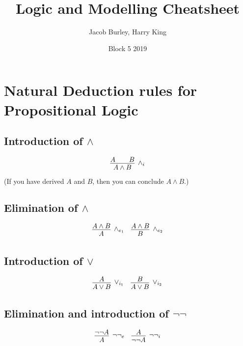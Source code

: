 \documentclass{article}
\title{Logic and Modelling Cheatsheet}
\author{Jacob Burley, Harry King}
\date{Block 5 2019}
\newcommand{\rulename}[1]{#1}
\begin{document}
\maketitle

\section*{Natural Deduction rules for Propositional Logic}
  \subsection*{Introduction of $\wedge$}
      \begin{align*}
        \infer[\rulename{\wedge_i}]
        {A \wedge B}
        {A && B}
      \end{align*}
      (If you have derived $A$ and $B$, then you can conclude $A \wedge B$.)
  \subsection*{Elimination of $\wedge$}
      \begin{align*}
        \infer[\rulename{\wedge_{e_1}}]
        {A}
        {A \wedge B}
        &&
        \infer[\rulename{\wedge_{e_2}}]
        {B}
        {A \wedge B}
      \end{align*}

  \subsection*{Introduction of $\vee$}
      \begin{align*}
        \infer[\rulename{\vee_{i_1}}]
        {A \vee B}
        {A}&&
        \infer[\rulename{\vee_{i_2}}]
        {A \vee B}
        {B}
      \end{align*}
      
  \subsection*{Elimination and introduction of $\neg\neg$}
      \begin{align*}
        \infer[\rulename{\neg\neg_e}]
        {A}
        {\neg\neg A}
        &&
        \infer[\rulename{\neg\neg_i}]
        {\neg\neg A}
        {A}
      \end{align*}
      
\end{document}
